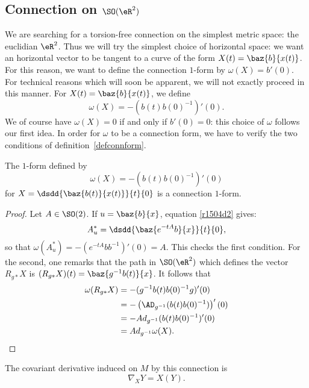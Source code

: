 \subsection{Connection on \texorpdfstring{$\SO(\eR^2)$}{SO(R2)}}

We are searching for a torsion-free connection on the simplest metric space: the euclidian $\eR^2$. Thus we will try the simplest choice of horizontal space: we want an horizontal vector to be tangent to a curve of the form $X(t)=\baz{b}{x(t)}$. For this reason, we want to define the connection $1$-form by $\omega(X)=b'(0)$. For technical reasons which will soon be apparent, we will not exactly proceed in this manner. For $X(t)=\baz{b}{x(t)}$, we define
\begin{equation}
	\omega(X)=-(b(t)b(0)^{-1})'(0).
\end{equation}
We of course have $\omega(X)=0$ if and only if $b'(0)=0$: this choice of $\omega$ follows our first idea. In order for $\omega$ to be a connection form, we have to verify the two conditions of definition~\ref{defconnform}.

\begin{proposition}
	The $1$-form defined by
	\[
		\omega(X)=-(b(t)b(0)^{-1})'(0)
	\]
	for $X=\displaystyle\dsdd{\baz{b(t)}{x(t)}}{t}{0}$ is a connection $1$-form.
\end{proposition}

\begin{proof}
	Let $A\in \SO(2)$. If $u=\baz{b}{x}$, equation \eqref{r1504d2} gives:
	\[
		A^*_u=\dsdd{\baz{e^{-tA}b}{x}}{t}{0},
	\]
	so that $\omega(A^*_u)=-(e^{-tA}bb^{-1})'(0)=A$. This checks the first condition. For the second, one remarks that the path in $\SO(\eR^2)$ which defines the vector $R_{g*}X$ is $(R_{g*}X)(t)=\baz{g^{-1} b(t)}{x}$. It follows that
	\begin{equation}
		\begin{split}
			\omega(R_{g*}X)&=-(g^{-1} b(t)b(0)^{-1} g)'(0)\\
			&=-\left(\AD_{g^{-1}}(b(t)b(0)^{-1})\right)'(0)\\
			&=-Ad_{g^{-1}}(b(t)b(0)^{-1})'(0)\\
			&=Ad_{g^{-1}}\omega(X).
		\end{split}
	\end{equation}

\end{proof}

\begin{proposition}
	The covariant derivative induced on $M$ by this connection is
	\begin{equation}\label{derrcovexplicite}
		\nabla_XY=X(Y).
	\end{equation}
\end{proposition}

